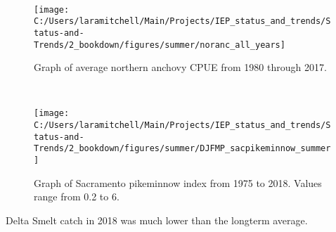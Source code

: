\documentclass[
]{book}
\begin{document}
\begin{panel-grid}
\begin{columns-nocenter}
\begin{column40}

~

\end{column40}

\begin{column800}

\begin{expand}

\begin{figure}
\texttt{[image: C:/Users/laramitchell/Main/Projects/IEP\_status\_and\_trends/Status-and-Trends/2\_bookdown/figures/summer/noranc\_all\_years]} \caption{Graph of average northern anchovy CPUE from 1980 through 2017.}\label{fig:unnamed-chunk-80}
\end{figure}

\end{expand}

\end{column800}

\begin{column40}

~

\end{column40}

\begin{column800}

\begin{expand}

\begin{figure}
\texttt{[image: C:/Users/laramitchell/Main/Projects/IEP\_status\_and\_trends/Status-and-Trends/2\_bookdown/figures/summer/DJFMP\_sacpikeminnow\_summer]} \caption{Graph of Sacramento pikeminnow index from 1975 to 2018. Values range from 0.2 to 6.}\label{fig:unnamed-chunk-81}
\end{figure}

\end{expand}

\end{column800}

\end{columns-nocenter}

\begin{columns-nocenter}

\begin{column800}

Delta Smelt catch in 2018 was much lower than the longterm average.

\end{column800}

\begin{column40}


\end{column40}
\end{columns-nocenter}
\end{panel-grid}
\end{document}
